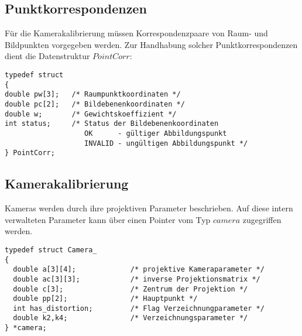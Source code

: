 
\subsection{Punktkorrespondenzen}

Für die Kamerakalibrierung müssen Korrespondenzpaare von Raum- und Bildpunkten
vorgegeben werden. Zur Handhabung solcher Punktkorrespondenzen dient die
Datenstruktur $PointCorr$:
\begprogr\begin{verbatim}
typedef struct
{
double pw[3];   /* Raumpunktkoordinaten */
double pc[2];   /* Bildebenenkoordinaten */
double w;       /* Gewichtskoeffizient */
int status;     /* Status der Bildebenenkoordinaten
                   OK      - gültiger Abbildungspunkt
                   INVALID - ungültigen Abbildungspunkt */
} PointCorr;
\end{verbatim}\endprogr



\subsection{Kamerakalibrierung}

Kameras werden durch ihre projektiven Parameter beschrieben. Auf diese intern
verwalteten Parameter kann über einen Pointer vom Typ $camera$ zugegriffen
werden.
\begprogr\begin{verbatim}
typedef struct Camera_
{
  double a[3][4];             /* projektive Kameraparameter */
  double ac[3][3];            /* inverse Projektionsmatrix */
  double c[3];                /* Zentrum der Projektion */
  double pp[2];               /* Hauptpunkt */
  int has_distortion;         /* Flag Verzeichnungparameter */
  double k2,k4;               /* Verzeichnungsparameter */
} *camera;
\end{verbatim}\endprogr

